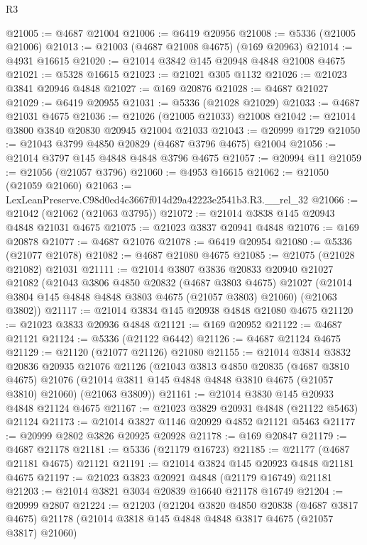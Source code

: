 \begin{lexlean}{R3}
\begin{coremodule}
@21005 := @4687 @21004
@21006 := @6419 @20956
@21008 := @5336 (@21005 @21006)
@21013 := @21003 (@4687 @21008 @4675) (@169 @20963)
@21014 := @4931 @16615
@21020 := @21014 @3842 @145 @20948 @4848 @21008 @4675
@21021 := @5328 @16615
@21023 := @21021 @305 @1132
@21026 := @21023 @3841 @20946 @4848
@21027 := @169 @20876
@21028 := @4687 @21027
@21029 := @6419 @20955
@21031 := @5336 (@21028 @21029)
@21033 := @4687 @21031 @4675
@21036 := @21026 (@21005 @21033) @21008
@21042 := @21014 @3800 @3840 @20830 @20945 @21004 @21033
@21043 := @20999 @1729
@21050 := @21043 @3799 @4850 @20829 (@4687 @3796 @4675) @21004
@21056 := @21014 @3797 @145 @4848 @4848 @3796 @4675
@21057 := @20994 @11
@21059 := @21056 (@21057 @3796)
@21060 := @4953 @16615
@21062 := @21050 (@21059 @21060)
@21063 := LexLeanPreserve.C98d0ed4c3667f014d29a42223e2541b3.R3.__rel_32
@21066 := @21042 (@21062 (@21063 @3795))
@21072 := @21014 @3838 @145 @20943 @4848 @21031 @4675
@21075 := @21023 @3837 @20941 @4848
@21076 := @169 @20878
@21077 := @4687 @21076
@21078 := @6419 @20954
@21080 := @5336 (@21077 @21078)
@21082 := @4687 @21080 @4675
@21085 := @21075 (@21028 @21082) @21031
@21111 := @21014
    @3807
    @3836
    @20833
    @20940
    @21027
    @21082
    (@21043
      @3806
      @4850
      @20832
      (@4687 @3803 @4675)
      @21027
      (@21014 @3804 @145 @4848 @4848 @3803 @4675 (@21057 @3803) @21060)
      (@21063 @3802))
@21117 := @21014 @3834 @145 @20938 @4848 @21080 @4675
@21120 := @21023 @3833 @20936 @4848
@21121 := @169 @20952
@21122 := @4687 @21121
@21124 := @5336 (@21122 @6442)
@21126 := @4687 @21124 @4675
@21129 := @21120 (@21077 @21126) @21080
@21155 := @21014
    @3814
    @3832
    @20836
    @20935
    @21076
    @21126
    (@21043
      @3813
      @4850
      @20835
      (@4687 @3810 @4675)
      @21076
      (@21014 @3811 @145 @4848 @4848 @3810 @4675 (@21057 @3810) @21060)
      (@21063 @3809))
@21161 := @21014 @3830 @145 @20933 @4848 @21124 @4675
@21167 := @21023 @3829 @20931 @4848 (@21122 @5463) @21124
@21173 := @21014 @3827 @1146 @20929 @4852 @21121 @5463
@21177 := @20999 @2802 @3826 @20925 @20928
@21178 := @169 @20847
@21179 := @4687 @21178
@21181 := @5336 (@21179 @16723)
@21185 := @21177 (@4687 @21181 @4675) @21121
@21191 := @21014 @3824 @145 @20923 @4848 @21181 @4675
@21197 := @21023 @3823 @20921 @4848 (@21179 @16749) @21181
@21203 := @21014 @3821 @3034 @20839 @16640 @21178 @16749
@21204 := @20999 @2807
@21224 := @21203
    (@21204
      @3820
      @4850
      @20838
      (@4687 @3817 @4675)
      @21178
      (@21014 @3818 @145 @4848 @4848 @3817 @4675 (@21057 @3817) @21060)

\end{coremodule}
\end{lexlean}
